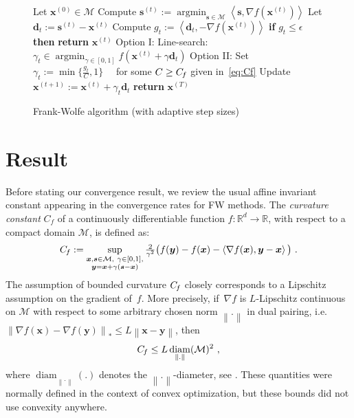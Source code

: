 \documentclass{article}
\newcommand{\R}{\mathbb{R}}
\newcommand{\X}{\mathcal{M}}
\newcommand{\prodscal}[2]{\left\langle#1,#2\right\rangle}
\newcommand{\x}{\bm{x}}
\newcommand{\y}{\bm{y}}
\newcommand{\s}{\bm{s}}
\newcommand{\xt}{\bm{x}^{(t)}}
\newcommand{\xtt}{\bm {x}^{(t+1)}}
\newcommand{\st}{\bm{s}^{(t)}}
\newcommand{\gap}{g_{t}}
\DeclareMathOperator{\diam}{diam}
\DeclareMathOperator*{\argmin}{\arg\min}
\providecommand{\norm}[1]{\left\lVert#1\right\rVert}
\newcommand{\domain}{\mathcal{M}} %
\newcommand{\stepsize}{\gamma}
\newcommand{\Cf}{C_{\hspace{-0.08em}f}}
\newcommand{\dd}{\bm{d}}
\newcommand{\innerProd}[2]{\left\langle #1 , #2 \right\rangle}
\newcommand{\0}{\mathbf{0}} %
\begin{document}
\begin{figure}
\centering
\begin{minipage}[t]{.7\textwidth}
  \null
  \begin{algorithm}[H]
    \caption{Frank-Wolfe algorithm (with adaptive step sizes)}\label{alg:FW}
    \begin{algorithmic}[1]
      \STATE Let $\x^{(0)} \in \X$
      \STATE Compute $\st := \displaystyle\argmin_{\s \in \X} \prodscal{\s}{\nabla f(\x^{(t)})}$
      \STATE Let $\dd_t := \st - \xt$ 
      \STATE Compute $g_t := \left\langle \dd_t, - \nabla f(\x^{(t)}) \right\rangle$  \label{line:FWgap}
      \STATE \textbf{if} $ \gap \leq \epsilon$ \textbf{then} \textbf{return} $\x^{(t)}$ 
      \STATE Option I: Line-search: $\stepsize_t \in \displaystyle\argmin_{\stepsize \in [0,1]} \textstyle  f\left(\x^{(t)} + \stepsize \dd_t\right)$
      \STATE Option II: Set $\stepsize_t := \min\{ \frac{g_t}{C}, 1 \} \quad$ for some $C \geq \Cf$ given in~\eqref{eq:Cf}
      \STATE Update $\xtt := \xt + \stepsize_t \dd_t$
      \ENDFOR
      \STATE \textbf{return} $\x^{(T)}$
    \end{algorithmic}
  \end{algorithm}
\end{minipage}%
\end{figure}

\vspace{-3mm}
\section{Result}
\vspace{-2mm}
Before stating our convergence result, we review the usual affine invariant constant appearing in the convergence rates for FW methods. The \emph{curvature constant} $C_{f}$ of a continuously differentiable
function $f:\R^d\rightarrow\R$, with respect to a compact domain $\domain$, is defined as:
\begin{equation}\label{eq:Cf}
  \Cf := \sup_{\substack{\x,\s\in \domain,  ~\stepsize\in[0,1],\\
                      \y = \x+\stepsize(\s-\x)}} \textstyle
           \frac{2}{\stepsize^2}\big( f(\y)-f(\x)-\innerProd{\nabla f(\x)}{\y-\x}\big) \ .
\end{equation}
The assumption of bounded curvature $\Cf$ closely corresponds to a Lipschitz
assumption on the gradient of~$f$. %
More precisely, if~$\nabla f$ is $L$-Lipschitz continuous on $\domain$ with
respect to some arbitrary chosen norm $\norm{.}$ in dual pairing, i.e.
$\norm{\nabla f(\x) - \nabla f(\y)}_* \leq L \norm{\x-\y}$, then
\begin{equation} \label{eq:CfBound}
\Cf \le L \diam_{\norm{.}}(\domain)^2  \ ,
\end{equation}
where $\diam_{\norm{.}}(.)$ denotes the $\norm{.}$-diameter, see \citep[Lemma
7]{jaggi2013revisiting}. These quantities were normally defined in the context of convex optimization, but these bounds did not use convexity anywhere.
\end{document}
